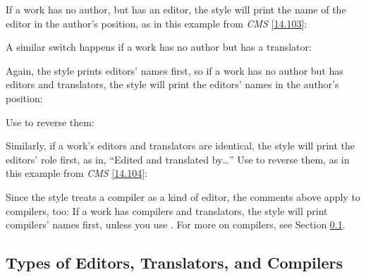 \documentclass[11pt,letterpaper,oneside]{article}
\begin{document}
\begin{citebib}
\item \cite{doe2010a}
\item \cite{doe2010b}
\end{citebib}

If a work has no author, but has an editor, the style will print the
name of the editor in the author's position, as in this example from
\textit{CMS} \ref{14.103}:

\begin{citebib}
\item \cite[100]{egan2014}
\end{citebib}

\noindent A similar switch happens if a work has no author but has a
translator:

\begin{citebib}
\item \cite[34]{silverstein1974}
\end{citebib}

Again, the style prints editors' names first, so if a work has no
author but has editors and translators, the style will print the
editors' names in the author's position:

\begin{citebib}
\item \cite{smith2002a}
\end{citebib}

\noindent Use  to reverse them:

\begin{citebib}
\item \cite{smith2002b}
\end{citebib}

Similarly, if a work's editors and translators are identical, the
style will print the editors' role first, as in, ``Edited and
translated by\ldots'' Use  to reverse them, as in this
example from \textit{CMS} \ref{14.104}:

\begin{citebib}
\item \cite{menchu1999}
\end{citebib}

Since the style treats a compiler as a kind of editor, the comments
above apply to compilers, too: If a work has compilers and
translators, the style will print compilers' names first, unless you
use . For more on compilers, see Section
\ref{edtransnames}.

\subsection{Types of Editors, Translators, and Compilers}
\label{edtransnames}
\end{document}
